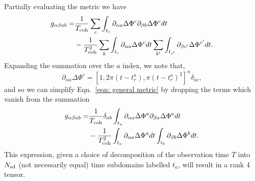 \documentclass[../full_thesis/full_thesis.tex]{subfiles}
\begin{document}
Partially evaluating the metric we have
\begin{align}
\begin{split}
g_{\alpha\beta ab} = &  \frac{1}{T_{\mathrm{coh}}}\sum_{c} \int_{t_{c}}
                        \partial_{\alpha a}\Delta \Phi^{c}
                        \partial_{\beta b}\Delta \Phi^{c}  dt\\
 & -
\frac{1}{T_{\mathrm{coh}}^{2}}
\sum_{b} \int_{t_{c}}\partial_{\alpha a}\Delta \Phi^{c} dt
\sum_{b'} \int_{t_{c'}}\partial_{\beta c'}\Delta \Phi^{c'} dt.
\end{split}
\label{eqn: general metric}
\end{align}
Expanding the summation over the $a$ index, we note that,
\begin{equation}
 \partial_{\alpha a}\Delta \Phi^{c}  = \left[1, 2\pi (t - t_{r}^{a}),
                                           \pi (t - t_{r}^{a})^{2}
                                           \right]^{\alpha} \delta_{ac},
\label{eqn: NEterm}
\end{equation}
and so we can simplify Eqn.~\eqref{eqn: general metric} by dropping the terms
which vanish from the summation
\begin{align}
\begin{split}
g_{\alpha\beta ab} =& \frac{1}{T_{\mathrm{coh}}}\delta_{ab} \int_{t_{a}}
                      \partial_{\alpha a}\Delta \Phi^{a}
                      \partial_{\beta a}\Delta \Phi^{a} dt \\
 & - \frac{1}{T_{\mathrm{coh}}^{2}} \int_{t_{a}} \partial_{\alpha a}\Delta \Phi^{a} dt
  \int_{t_{b}} \partial_{\beta b}\Delta \Phi^{b} dt.
\end{split}
\label{eqn: metric}
\end{align}
This expression, given a choice of decomposition of the observation time $T$ into
$N_{\textrm{sd}}$ (not necessarily equal) time subdomains labelled $t_{a}$, will result in a rank 4
tensor.
\end{document}
